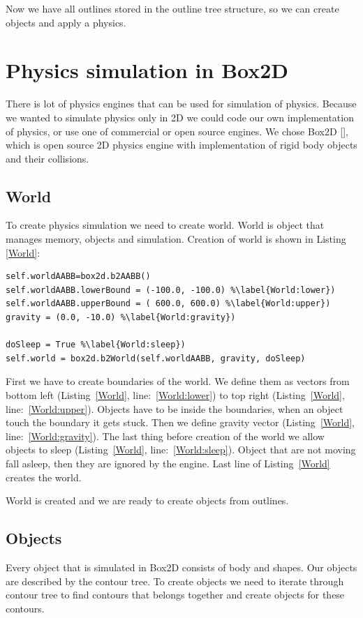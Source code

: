 \documentclass{ifacconf}
\begin{document}
Now we have all outlines stored in the outline tree structure, so we can create
objects and apply a physics.

\section{Physics simulation in Box2D}
There is lot of physics engines that can be used for simulation of physics.
Because we wanted to simulate physics only in 2D we could code our own
implementation of physics, or use one of commercial or open source engines. We
chose Box2D [\cite{GameEngines}], which is open source 2D physics engine with
implementation of rigid body objects and their collisions.
\subsection{World}
To create physics simulation we need to create world. World is object that
manages memory, objects and simulation. Creation of world is shown in Listing
\ref{World}:
\begin{lstlisting}[caption=Creation of Box2D world,label=World]
self.worldAABB=box2d.b2AABB()
self.worldAABB.lowerBound = (-100.0, -100.0) %\label{World:lower})
self.worldAABB.upperBound = ( 600.0, 600.0)	%\label{World:upper})
gravity = (0.0, -10.0) %\label{World:gravity})

doSleep = True %\label{World:sleep})
self.world = box2d.b2World(self.worldAABB, gravity, doSleep)
\end{lstlisting}
First we have to create boundaries of the world. We define them as vectors from
bottom left (Listing~\ref{World}, line:~\ref{World:lower}) to top right
(Listing~\ref{World}, line:~\ref{World:upper}). Objects have to be inside the
boundaries, when an object touch the boundary it gets stuck. Then we define
gravity vector (Listing~\ref{World}, line:~\ref{World:gravity}). The last
thing before creation of the world we allow objects to
sleep (Listing~\ref{World}, line:~\ref{World:sleep}). Object that are not moving
fall asleep, then they are ignored by the engine. Last line of
Listing~\ref{World} creates the world.

World is created and we are ready to create objects from outlines.

\subsection{Objects}
Every object that is simulated in Box2D consists of body and shapes. Our objects
are described by the contour tree. To create objects we need to iterate
through contour tree to find contours that belongs together and create
objects for these contours.
\end{document}
